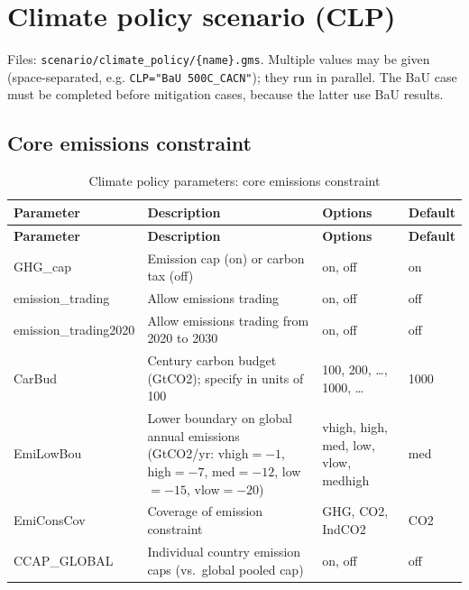 \documentclass[10pt,a4paper,titlepage,dvipdfmx]{book}
\begin{document}
\section{Climate policy scenario (CLP)}

Files: \texttt{scenario/climate\_policy/\{name\}.gms}. Multiple values may be
given (space-separated, e.g. \texttt{CLP="BaU 500C\_CACN"}); they run in
parallel. The BaU case must be completed before mitigation cases, because the
latter use BaU results.

\subsection{Core emissions constraint}
\begin{longtable}{|p{}|p{}|p{}|p{}|}
\caption{Climate policy parameters: core emissions constraint}\label{tab:sp-clp-core}\\
\hline
\textbf{Parameter} & \textbf{Description} & \textbf{Options} & \textbf{Default} \\ \hline
\endfirsthead
\hline
\textbf{Parameter} & \textbf{Description} & \textbf{Options} & \textbf{Default} \\ \hline
\endhead
\hline
\endfoot
GHG\_cap & Emission cap (on) or carbon tax (off) & on, off & on \\ \hline
emission\_trading & Allow emissions trading & on, off & off \\ \hline
emission\_trading2020 & Allow emissions trading from 2020 to 2030 & on, off & off \\ \hline
CarBud & Century carbon budget (GtCO2); specify in units of 100 & 100, 200, \ldots, 1000, \ldots & 1000 \\ \hline
EmiLowBou & Lower boundary on global annual emissions (GtCO2/yr: vhigh$=-1$, high$=-7$, med$=-12$, low$=-15$, vlow$=-20$) & vhigh, high, med, low, vlow, medhigh & med \\ \hline
EmiConsCov & Coverage of emission constraint & GHG, CO2, IndCO2 & CO2 \\ \hline
CCAP\_GLOBAL & Individual country emission caps (vs.\ global pooled cap) & on, off & off \\ \hline
\end{longtable}
\end{document}
